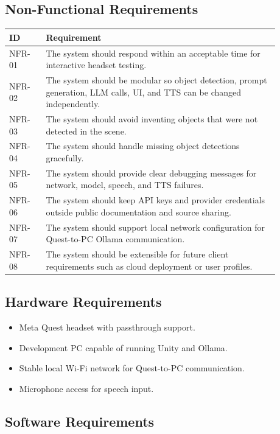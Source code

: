 \documentclass[12pt,a4paper]{article}
\begin{document}
\subsection{Non-Functional Requirements}

\begin{longtable}{p{0.12\linewidth} p{0.76\linewidth}}
\toprule
\textbf{ID} & \textbf{Requirement}\\
\midrule
NFR-01 & The system should respond within an acceptable time for interactive headset testing.\\
NFR-02 & The system should be modular so object detection, prompt generation, LLM calls, UI, and TTS can be changed independently.\\
NFR-03 & The system should avoid inventing objects that were not detected in the scene.\\
NFR-04 & The system should handle missing object detections gracefully.\\
NFR-05 & The system should provide clear debugging messages for network, model, speech, and TTS failures.\\
NFR-06 & The system should keep API keys and provider credentials outside public documentation and source sharing.\\
NFR-07 & The system should support local network configuration for Quest-to-PC Ollama communication.\\
NFR-08 & The system should be extensible for future client requirements such as cloud deployment or user profiles.\\
\bottomrule
\end{longtable}

\subsection{Hardware Requirements}

\begin{itemize}
    \item Meta Quest headset with passthrough support.
    \item Development PC capable of running Unity and Ollama.
    \item Stable local Wi-Fi network for Quest-to-PC communication.
    \item Microphone access for speech input.
\end{itemize}

\subsection{Software Requirements}
\end{document}
